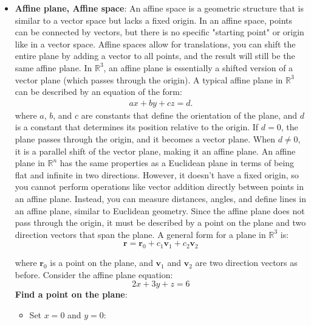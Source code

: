 \documentclass{report}
\begin{document}
\begin{itemize}
        \item \textbf{Affine plane, Affine space}: An affine space is a geometric structure that is similar to a vector space but lacks a fixed origin. In an affine space, points can be connected by vectors, but there is no specific "starting point" or origin like in a vector space.
            \bigbreak \noindent 
            Affine spaces allow for translations, you can shift the entire plane by adding a vector to all points, and the result will still be the same affine plane.
            \bigbreak \noindent 
            In $\mathbb{R}^{3}$, an affine plane is essentially a shifted version of a vector plane (which passes through the origin).
            \bigbreak \noindent 
            A typical affine plane in $\mathbb{R}^{3}$ can be described by an equation of the form:
            \begin{align*}
                ax + by + cz = d
            .\end{align*}
            \bigbreak \noindent 
            where $a$, $b$, and $c$ are constants that define the orientation of the plane, and $d$ is a constant that determines its position relative to the origin.
            \bigbreak \noindent 
            If $d=0$, the plane passes through the origin, and it becomes a vector plane. When $d\ne0$, it is a parallel shift of the vector plane, making it an affine plane.
            \bigbreak \noindent 
            An affine plane in $\mathbb{R}^{n}$ has the same properties as a Euclidean plane in terms of being flat and infinite in two directions.
            \bigbreak \noindent 
            However, it doesn't have a fixed origin, so you cannot perform operations like vector addition directly between points in an affine plane.
            \bigbreak \noindent 
            Instead, you can measure distances, angles, and define lines in an affine plane, similar to Euclidean geometry.
            \bigbreak \noindent 
            Since the affine plane does not pass through the origin, it must be described  by a point on the plane and two direction vectors that span the plane. A general form for a plane in \(\mathbb{R}^3\) is:
            \[
                \mathbf{r} = \mathbf{r}_0 + c_1 \mathbf{v}_1 + c_2 \mathbf{v}_2
            \]

            where \(\mathbf{r}_0\) is a point on the plane, and \(\mathbf{v}_1\) and \(\mathbf{v}_2\) are two direction vectors as before.
            \bigbreak \noindent 
            Consider the affine plane equation:
            \[
                2x + 3y + z = 6
            \]
            \textbf{Find a point on the plane}:
            \begin{itemize}
                \item Set \(x = 0\) and \(y = 0\):


\end{itemize}
\end{itemize}
\end{document}
